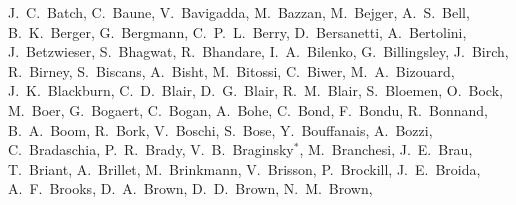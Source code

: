 {J.~C.~Batch,  %
C.~Baune,  %
V.~Bavigadda, %
M.~Bazzan, %
M.~Bejger, %
A.~S.~Bell,  %
B.~K.~Berger,  %
G.~Bergmann,  %
C.~P.~L.~Berry,  %
D.~Bersanetti, %
A.~Bertolini, %
J.~Betzwieser,  %
S.~Bhagwat,  %
R.~Bhandare,  %
I.~A.~Bilenko,  %
G.~Billingsley,  %
J.~Birch,  %
R.~Birney,  %
S.~Biscans,  %
A.~Bisht,    %
M.~Bitossi, %
C.~Biwer,  %
M.~A.~Bizouard, %
J.~K.~Blackburn,  %
C.~D.~Blair,  %
D.~G.~Blair,  %
R.~M.~Blair,  %
S.~Bloemen, %
O.~Bock,  %
M.~Boer, %
G.~Bogaert, %
C.~Bogan,  %
A.~Bohe,  %
C.~Bond,  %
F.~Bondu, %
R.~Bonnand, %
B.~A.~Boom, %
R.~Bork,  %
V.~Boschi, %
S.~Bose,  %
Y.~Bouffanais, %
A.~Bozzi, %
C.~Bradaschia, %
P.~R.~Brady,  %
V.~B.~Braginsky${}^{*}$,  %
M.~Branchesi, %
J.~E.~Brau,   %
T.~Briant, %
A.~Brillet, %
M.~Brinkmann,  %
V.~Brisson, %
P.~Brockill,  %
J.~E.~Broida,	%
A.~F.~Brooks,  %
D.~A.~Brown,  %
D.~D.~Brown,  %
N.~M.~Brown,  %
}
